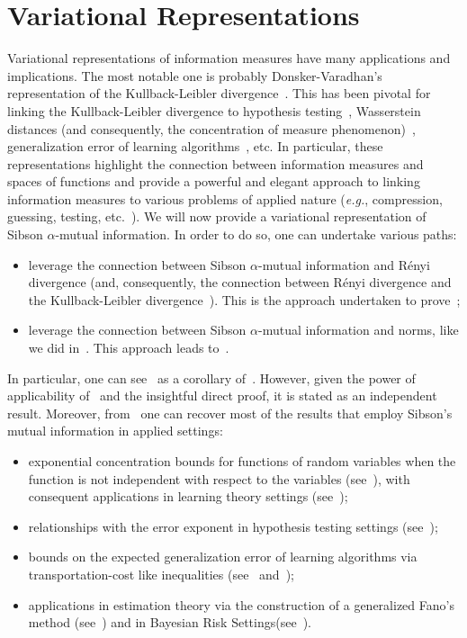 \documentclass{article}
\numberwithin{theorem}{section}
\numberwithin{example}{section}
\numberwithin{remark}{section}
\numberwithin{definition}{section}
\begin{document}
\section{Variational Representations}\label{sec:variational} 
Variational representations of information measures have many applications and implications. The most notable one is probably Donsker-Varadhan's representation of the Kullback-Leibler divergence~\cite{DonskerVaradhan:75,Varadhan:84}. This has been pivotal for linking the Kullback-Leibler divergence to hypothesis testing~\cite{sanov:58}, Wasserstein distances (and consequently, the concentration of measure phenomenon)~\cite{Marton:96,Marton:96b,Marton:98,RaginskyS:14}, generalization error of learning algorithms~\cite{RussoZ:16, XuR:17}, etc. In particular, these representations highlight the connection between information measures and spaces of functions and provide a powerful and elegant approach to linking information measures to various problems of applied nature (\textit{e.g.}, compression, guessing, testing, etc.~\cite{Esposito:22}).
We will now provide a variational representation of Sibson $\alpha$-mutual information.
In order to do so, one can undertake various paths:
\begin{itemize}
    \item leverage the connection between Sibson $\alpha$-mutual information and R\'enyi divergence (and, consequently, the connection between R\'enyi divergence and the Kullback-Leibler divergence~\cite[Theorem 30]{renyiDiv}). This is the approach undertaken to prove~;
    \item leverage the connection between Sibson $\alpha$-mutual information and norms, like we did in~. This approach leads to~.
\end{itemize}
In particular, one can see~ as a corollary of~. However, given the power of applicability of~ and the insightful direct proof, it is stated as an independent result. Moreover, from~ one can recover most of the results that employ Sibson's mutual information in applied settings: 
\begin{itemize}
    \item exponential concentration bounds for functions of random variables when the function is not independent with respect to the variables (see~), with consequent applications in learning theory settings (see~);
   
    \item relationships with the error exponent in hypothesis testing settings (see~);
     \item bounds on the expected generalization error of learning algorithms via transportation-cost like inequalities (see~ and~);
    \item applications in estimation theory via the construction of a generalized Fano's method (see~) and in Bayesian Risk Settings(see~).
\end{itemize}
\end{document}
